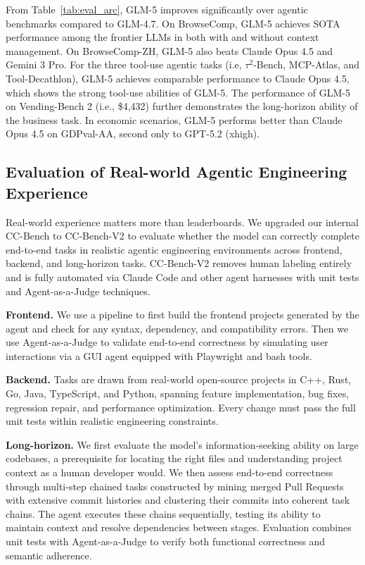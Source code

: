 \documentclass{article}
\theoremstyle{definition}
\begin{document}
From Table~\ref{tab:eval_arc}, GLM-5 improves significantly over agentic benchmarks compared to GLM-4.7. 
On BrowseComp, GLM-5 achieves SOTA performance among the frontier LLMs in both with and without context management. 
On BrowseComp-ZH, GLM-5 also beats Claude Opus 4.5 and Gemini 3 Pro. 
For the three tool-use agentic tasks (i.e, $\tau^2$-Bench, MCP-Atlas, and Tool-Decathlon), GLM-5 achieves comparable performance to Claude Opus 4.5, which shows the strong tool-use abilities of GLM-5. 
The performance of GLM-5 on Vending-Bench 2 (i.e., \$4,432) further demonstrates the long-horizon ability of the business task. 
In economic scenarios, GLM-5 performs better than Claude Opus 4.5 on GDPval-AA, second only to GPT-5.2 (xhigh). 

\subsection{Evaluation of Real-world Agentic Engineering Experience}

Real-world experience matters more than leaderboards. We upgraded our internal CC-Bench to CC-Bench-V2 to evaluate whether the model can correctly complete end-to-end tasks in realistic agentic engineering environments across frontend, backend, and long-horizon tasks. CC-Bench-V2 removes human labeling entirely and is fully automated via Claude Code and other agent harnesses with unit tests and Agent-as-a-Judge techniques.

\textbf{Frontend.} We use a pipeline to first build the frontend projects generated by the agent and check for any syntax, dependency, and compatibility errors. Then we use Agent-as-a-Judge to validate end-to-end correctness by simulating user interactions via a GUI agent equipped with Playwright and bash tools.

\textbf{Backend.} Tasks are drawn from real-world open-source projects in C++, Rust, Go, Java, TypeScript, and Python, spanning feature implementation, bug fixes, regression repair, and performance optimization. Every change must pass the full unit tests within realistic engineering constraints.

\textbf{Long-horizon.} We first evaluate the model's information-seeking ability on large codebases, a prerequisite for locating the right files and understanding project context as a human developer would. We then assess end-to-end correctness through multi-step chained tasks constructed by mining merged Pull Requests with extensive commit histories and clustering their commits into coherent task chains. The agent executes these chains sequentially, testing its ability to maintain context and resolve dependencies between stages. Evaluation combines unit tests with Agent-as-a-Judge to verify both functional correctness and semantic adherence.
\end{document}

